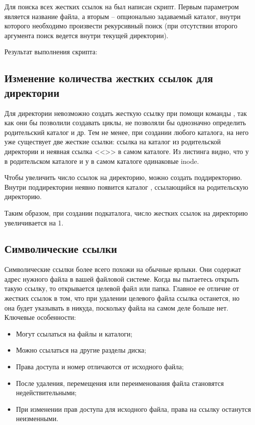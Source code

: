 Для поиска всех жестких ссылок на был написан скрипт. Первым параметром является название файла, а вторым -- опционально задаваемый каталог, внутри которого необходимо произвести рекурсивный поиск (при отсутствии второго аргумента поиск ведется внутри текущей директории).


Результат выполнения скрипта:


\subsection{Изменение количества жестких ссылок для директории}

Для директории невозможно создать жесткую ссылку при помощи команды , так как они бы позволили создавать циклы, не позволяли бы однозначно определить родительский каталог и др. Тем не менее, при создании любого каталога, на него уже существует две жесткие ссылки: ссылка на каталог из родительской директории и неявная ссылка <<>> в самом каталоге. Из листинга видно, что у  в родительском каталоге и у  в самом каталоге одинаковые inode.


Чтобы увеличить число ссылок на директорию, можно создать поддиректорию. Внутри поддиректории неявно появится каталог , ссылающийся на родительскую директорию.


Таким образом, при создании подкаталога, число жестких ссылок на директорию увеличивается на 1.

\subsection{Символические ссылки}

Символические ссылки более всего похожи на обычные ярлыки. Они содержат адрес нужного файла в вашей файловой системе. Когда вы пытаетесь открыть такую ссылку, то открывается целевой файл или папка. Главное ее отличие от жестких ссылок в том, что при удалении целевого файла ссылка останется, но она будет указывать в никуда, поскольку файла на самом деле больше нет. Ключевые особенности:
\begin{itemize}
	\item Могут ссылаться на файлы и каталоги;
	\item Можно ссылаться на другие разделы диска;
	\item Права доступа и номер  отличаются от исходного файла;
	\item После удаления, перемещения или переименования файла становятся недействительными;
	\item При изменении прав доступа для исходного файла, права на ссылку останутся неизменными.
\end{itemize}

